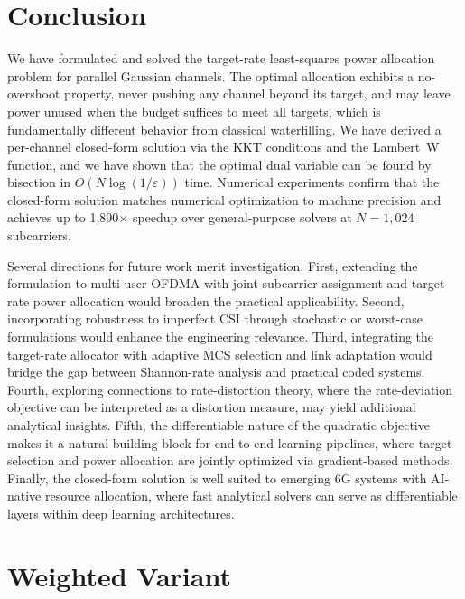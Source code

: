 \documentclass[journal]{IEEEtran}
\begin{document}
\section{Conclusion}
\label{sec:conclusion}

We have formulated and solved the target-rate least-squares power allocation problem for parallel Gaussian channels.
The optimal allocation exhibits a no-overshoot property, never pushing any channel beyond its target, and may leave power unused when the budget suffices to meet all targets, which is fundamentally different behavior from classical waterfilling.
We have derived a per-channel closed-form solution via the KKT conditions and the Lambert~W function, and we have shown that the optimal dual variable can be found by bisection in $O(N\log(1/\varepsilon))$ time.
Numerical experiments confirm that the closed-form solution matches numerical optimization to machine precision and achieves up to 1{,}890$\times$ speedup over general-purpose solvers at $N = 1{,}024$ subcarriers.

Several directions for future work merit investigation.
First, extending the formulation to multi-user OFDMA with joint subcarrier assignment and target-rate power allocation would broaden the practical applicability.
Second, incorporating robustness to imperfect CSI through stochastic or worst-case formulations would enhance the engineering relevance.
Third, integrating the target-rate allocator with adaptive MCS selection and link adaptation would bridge the gap between Shannon-rate analysis and practical coded systems.
Fourth, exploring connections to rate-distortion theory, where the rate-deviation objective can be interpreted as a distortion measure, may yield additional analytical insights.
Fifth, the differentiable nature of the quadratic objective makes it a natural building block for end-to-end learning pipelines, where target selection and power allocation are jointly optimized via gradient-based methods.
Finally, the closed-form solution is well suited to emerging 6G systems with AI-native resource allocation, where fast analytical solvers can serve as differentiable layers within deep learning architectures.

\appendices
\section{Weighted Variant}
\label{app:weighted}
\end{document}
